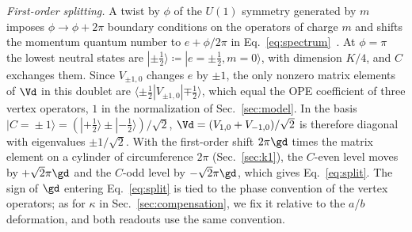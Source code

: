 \emph{First-order splitting.}
A twist by $\phi$ of the $U(1)$ symmetry generated by $m$ imposes $\phi\to\phi+2\pi$ boundary conditions on the operators of charge $m$ and shifts the momentum quantum number to $e+\phi/2\pi$ in Eq.~\eqref{eq:spectrum}~\cite{Alcaraz1988}.
At $\phi=\pi$ the lowest neutral states are $|{\pm\tfrac12}\rangle\coloneqq|e=\pm\tfrac12,m=0\rangle$, with dimension $K/4$, and $C$ exchanges them.
Since $V_{\pm1,0}$ changes $e$ by $\pm1$, the only nonzero matrix elements of $\Vd$ in this doublet are $\langle{\pm\tfrac12}|V_{\pm1,0}|{\mp\tfrac12}\rangle$, which equal the OPE coefficient of three vertex operators, $1$ in the normalization of Sec.~\ref{sec:model}.
In the basis $|C\!=\!\pm1\rangle=(|{+\tfrac12}\rangle\pm|{-\tfrac12}\rangle)/\sqrt2$, $\Vd=(V_{1,0}+V_{-1,0})/\sqrt2$ is therefore diagonal with eigenvalues $\pm1/\sqrt2$.
With the first-order shift $2\pi\gd$ times the matrix element on a cylinder of circumference $2\pi$ (Sec.~\ref{sec:k1}), the $C$-even level moves by $+\sqrt2\pi\gd$ and the $C$-odd level by $-\sqrt2\pi\gd$, which gives Eq.~\eqref{eq:split}.
The sign of $\gd$ entering Eq.~\eqref{eq:split} is tied to the phase convention of the vertex operators; as for $\kappa$ in Sec.~\ref{sec:compensation}, we fix it relative to the $a$/$b$ deformation, and both readouts use the same convention.
